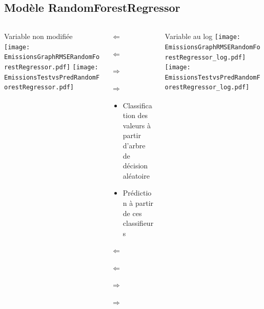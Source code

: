 \documentclass[8pt,aspectratio=169,hyperref={unicode=true}]{beamer}
\begin{document}
\subsection{Modèle RandomForestRegressor}
\begin{frame}{\insertsubsection}
  \begin{columns}[t]
    \begin{column}{.33\textwidth}
      \centering Variable non modifiée
      \texttt{[image: EmissionsGraphRMSERandomForestRegressor.pdf]}
      \texttt{[image: EmissionsTestvsPredRandomForestRegressor.pdf]}
    \end{column}
    \begin{column}{.33\textwidth}
      $\Longleftarrow$

      {\footnotesize
      }

      \raggedright
      $\Longleftarrow$

      \raggedleft
      $\Longrightarrow$
      
      {\footnotesize
      }

      \raggedleft
      $\Longrightarrow$

      \raggedright
      \begin{itemize}
        \item Classification des valeurs à partir d'arbre de décision aléatoire
        \item Prédiction à partir de ces classifieurs
      \end{itemize}

      $\Longleftarrow$
      {\scriptsize \centering
          }

      $\Longleftarrow$

      \raggedleft
      $\Longrightarrow$

      {\scriptsize \centering
          
        }
      \raggedleft
      $\Longrightarrow$
    \end{column}
    \begin{column}{.33\textwidth}
      \centering Variable au log
      \texttt{[image: EmissionsGraphRMSERandomForestRegressor\_log.pdf]}
      \texttt{[image: EmissionsTestvsPredRandomForestRegressor\_log.pdf]}
    \end{column}
  \end{columns}
\end{frame}
\end{document}
